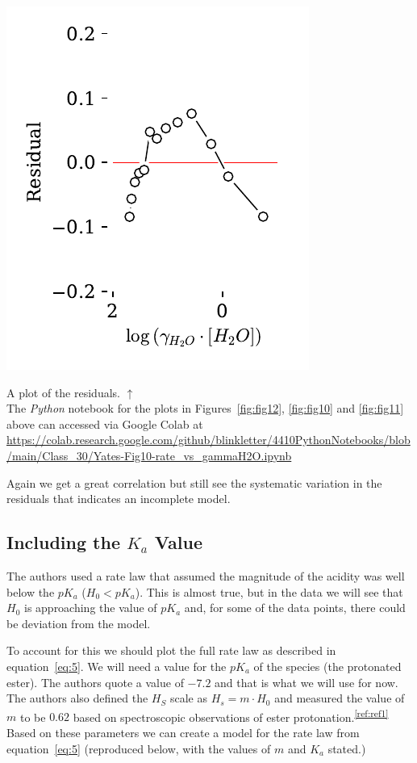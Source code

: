 \documentclass[]{tufte-handout}
\begin{document}
\begin{marginfigure}[35mm]
  \centering
  \includegraphics[scale=0.7]{images/fig10r}
  \caption{A plot of the residuals. $\uparrow$ \\ \vspace{3mm} The \textit{Python} notebook for the plots in Figures~\ref{fig:fig12}, \ref{fig:fig10} and \ref{fig:fig11} above can accessed via Google Colab at \url{https://colab.research.google.com/github/blinkletter/4410PythonNotebooks/blob/main/Class_30/Yates-Fig10-rate_vs_gammaH2O.ipynb}} 
  \label{fig:fig11}
\end{marginfigure}

Again we get a great correlation but still see the systematic variation in the residuals that indicates an incomplete model.

\subsection{Including the $K_a$ Value}

The authors used a rate law that assumed the magnitude of the acidity was well below the $pK_a$ ($H_0<pK_a$). This is almost true, but in the data we will see that $H_0$ is approaching the value of $pK_a$ and, for some of the data points, there could be deviation from the model.

To account for this we should plot the full rate law as described in equation~\vref{eq:5}. We will need a value for the $pK_a$ of the  species (the protonated ester). The authors quote a value of $-7.2$ and that is what we will use for now. The authors also defined the $H_S$ scale as $H_s = m\cdot H_0$ and measured the value of $m$ to be $0.62$ based on spectroscopic observations of ester protonation.\textsuperscript{\ref{ref:ref1}} Based on these parameters we can create a model for the rate law from equation~\ref{eq:5} (reproduced below, with the values of $m$ and $K_a$ stated.) 
\end{document}
